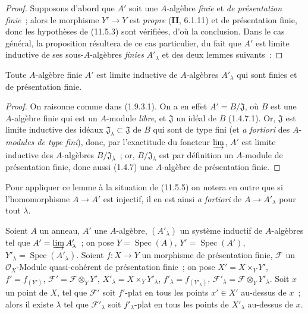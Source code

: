 \begin{proof}
Supposons d'abord que $A'$ soit une $A$-algèbre \emph{finie} et \emph{de présentation finie}~;
alors le morphisme $Y'\to Y$ est \emph{propre} (\textbf{II}, 6.1.11) et de présentation
finie, donc les hypothèses de (11.5.3) sont vérifiées, d'où la conclusion. Dans
le cas général, la proposition résultera de ce cas particulier, du fait que $A'$
est limite inductive de ses sous-$A$-algèbres \emph{finies} $A'_\lambda$ et des deux
lemmes suivants~:
\end{proof}

\begin{lemma}[11.5.5.1]
\label{IV.11.5.5.1-fr}
Toute $A$-algèbre finie $A'$ est limite inductive de $A$-algèbres $A'_\lambda$
qui sont finies et de présentation finie.
\end{lemma}

\begin{proof}
On raisonne comme dans (1.9.3.1). On a en effet $A'=B/\mathfrak J$, où $B$ est
une $A$-algèbre finie qui est un $A$-module \emph{libre}, et $\mathfrak J$ un idéal de
$B$ (1.4.7.1). Or, $\mathfrak J$ est limite inductive des idéaux
$\mathfrak J_\lambda\subset\mathfrak J$ de $B$ qui sont de type fini (et \emph{a
fortiori} des $A$-\emph{modules de type fini}), donc, par l'exactitude du foncteur
$\varinjlim$, $A'$ est limite inductive des $A$-algèbres
$B/\mathfrak J_\lambda$~; or, $B/\mathfrak J_\lambda$ est par définition un
$A$-module de présentation finie, donc aussi (1.4.7) une $A$-algèbre de
présentation finie.
\end{proof}


Pour appliquer ce lemme à la situation de (11.5.5) on notera en outre que si
l'homomorphisme $A\to A'$ est injectif, il en est ainsi \emph{a fortiori} de
$A\to A'_{\lambda}$ pour tout $\lambda$.

\begin{lemma}[11.5.5.2]
\label{IV.11.5.5.2-fr}
Soient $A$ un anneau, $A'$ une $A$-algèbre, $(A'_{\lambda})$ un système inductif
de $A$-algèbres tel que $A'=\varinjlim A'_{\lambda}$~; on pose
$Y=\operatorname{Spec}(A)$, $Y'=\operatorname{Spec}(A')$,
$Y'_{\lambda}=\operatorname{Spec}(A'_{\lambda})$. Soient $f:X\to Y$ un
morphisme de présentation finie, $\mathcal F$ un $\mathcal O_X$-Module
quasi-cohérent de présentation finie~; on pose $X'=X\times_Y Y'$,
$f'=f_{(Y')}$, $\mathcal F'=\mathcal F\otimes_Y Y'$,
$X'_{\lambda}=X\times_Y Y'_{\lambda}$, $f'_{\lambda}=f_{(Y'_{\lambda})}$,
$\mathcal F'_{\lambda}=\mathcal F\otimes_Y Y'_{\lambda}$. Soit $x$ un point de
$X$, tel que $\mathcal F'$ soit $f'$-plat en tous les points $x'\in X'$
au-dessus de $x$~; alors il existe $\lambda$ tel que $\mathcal F'_{\lambda}$
soit $f'_{\lambda}$-plat en tous les points de $X'_{\lambda}$ au-dessus de $x$.
\end{lemma}

